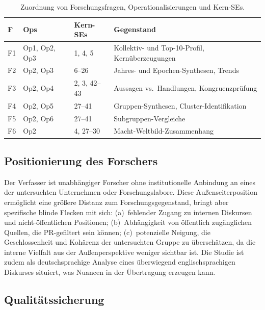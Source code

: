 \documentclass[12pt,a4paper]{article}
\begin{document}
\begin{table}[htbp]
  \centering
  \caption{Zuordnung von Forschungsfragen, Operationalisierungen und Kern-SEs.}
  \label{tab:zuordnung}
  \footnotesize
  \begin{tabularx}{\textwidth}{l l l X}
    \toprule
    \textbf{F} & \textbf{Ops} & \textbf{Kern-SEs} & \textbf{Gegenstand} \\
    \midrule
    F1 & Op1, Op2, Op3 & 1, 4, 5 & Kollektiv- und Top-10-Profil, Kern\"uberzeugungen \\
    F2 & Op2, Op3 & 6--26 & Jahres- und Epochen-Synthesen, Trends \\
    F3 & Op2, Op4 & 2, 3, 42--43 & Aussagen vs.\ Handlungen, Kongruenzpr\"ufung \\
    F4 & Op2, Op5 & 27--41 & Gruppen-Synthesen, Cluster-Identifikation \\
    F5 & Op2, Op6 & 27--41 & Subgruppen-Vergleiche \\
    F6 & Op2 & 4, 27--30 & Macht-Weltbild-Zusammenhang \\
    \bottomrule
  \end{tabularx}
\end{table}


\subsection{Positionierung des Forschers}
\label{sec:methodik:positionierung}

Der Verfasser ist unabh\"angiger Forscher ohne institutionelle Anbindung an eines der untersuchten Unternehmen oder Forschungslabore. Diese Au\ss{}enseiterposition erm\"oglicht eine gr\"o\ss{}ere Distanz zum Forschungsgegenstand, bringt aber spezifische blinde Flecken mit sich: (a)~fehlender Zugang zu internen Diskursen und nicht-\"offentlichen Positionen; (b)~Abh\"angigkeit von \"offentlich zug\"anglichen Quellen, die PR-gefiltert sein k\"onnen; (c)~potenzielle Neigung, die Geschlossenheit und Koh\"arenz der untersuchten Gruppe zu \"ubersch\"atzen, da die interne Vielfalt aus der Au\ss{}enperspektive weniger sichtbar ist. Die Studie ist zudem als deutschsprachige Analyse eines \"uberwiegend englischsprachigen Diskurses situiert, was Nuancen in der \"Ubertragung erzeugen kann.

\subsection{Qualit\"atssicherung}
\label{sec:methodik:qualitaet}
\end{document}
